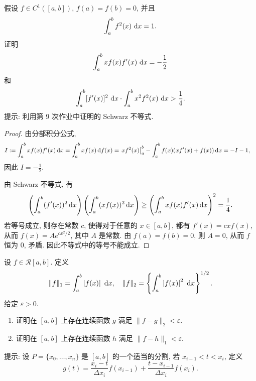 \documentclass{article}
\begin{document}
\begin{problem}
假设 $f \in C^1([a,b])$, $f(a)=f(b)=0$, 并且
\[
\int_a^b f^2(x)\,\,\mathrm{d} x = 1.
\]
证明
\[
\int_a^b x f(x)f'(x)\,\,\mathrm{d} x = -\frac{1}{2}
\]
和
\[
\int_a^b [f'(x)]^2\,\,\mathrm{d} x \cdot \int_a^b x^2 f^2(x)\,\,\mathrm{d} x > \frac{1}{4}.
\]
提示: 利用第 9 次作业中证明的 Schwarz 不等式.
\end{problem}

\begin{proof}
  由分部积分公式, 
  \begin{align*}
    I&:=\int_a^b x f(x)f'(x)\,\mathrm{d} x
    =\int_{a}^{b}xf(x)\,\mathrm{d} f(x)=\left. xf^2(x) \right|_a^b - \int_a^b f(x)(xf'(x)+f(x))\,\mathrm{d} x=-I-1,
  \end{align*}
  因此 \( I=-\frac{1}{2} \). 

  由 Schwarz 不等式, 有
  \[ \left( \int_{a}^{b}(f'(x))^2\,\mathrm{d} x \right)\left( \int_{a}^{b}(xf(x))^2\,\mathrm{d} x \right)
  \ge \left( \int_{a}^{b}xf(x)f'(x)\,\mathrm{d} x \right)^2=\frac{1}{4}. \]
  若等号成立, 则存在常数 \( c \), 使得对于任意的 \( x\in[a,b] \), 都有 \( f'(x)=cxf(x) \), 从而 \( f(x)=Ae^{cx^2/2} \), 其中 \( A \) 是常数. 由 \( f(a)=f(b)=0 \), 则 \( A=0 \), 从而 \( f \) 恒为 \( 0 \), 矛盾. 因此不等式中的等号不能成立.
\end{proof}



\begin{problem}
设 $f \in \mathcal{R}[a,b]$. 定义
\[
\lVert f \rVert_1 = \int_a^b \left|f(x)\right|\,\,\mathrm{d} x, \quad
\lVert f \rVert_2 = \left\{\int_a^b \left|f(x)\right|^2\,\,\mathrm{d} x\right\}^{1/2}.
\]
给定 $\varepsilon > 0$.
\begin{enumerate}[label=(\alph*)]
  \item 证明在 $[a,b]$ 上存在连续函数 $g$ 满足 $\lVert f-g \rVert_2 < \varepsilon$.
  \item 证明在 $[a,b]$ 上存在连续函数 $h$ 满足 $\lVert f-h \rVert_1 < \varepsilon$.
\end{enumerate}
提示: 设 $P = \{x_0,\dots,x_n\}$ 是 $[a,b]$ 的一个适当的分割, 若 $x_{i-1} < t < x_i$, 定义
\[
g(t) = \frac{x_i - t}{\Delta x_i} f(x_{i-1}) + \frac{t - x_{i-1}}{\Delta x_i} f(x_i).
\]
\end{problem}
\end{document}
